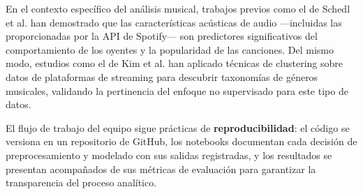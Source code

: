 En el contexto específico del análisis musical, trabajos previos como el de Schedl et al. \cite{schedl2018current} han demostrado que las características acústicas de audio ---incluidas las proporcionadas por la API de Spotify--- son predictores significativos del comportamiento de los oyentes y la popularidad de las canciones. Del mismo modo, estudios como el de Kim et al. \cite{kim2020music} han aplicado técnicas de clustering sobre datos de plataformas de streaming para descubrir taxonomías de géneros musicales, validando la pertinencia del enfoque no supervisado para este tipo de datos.

El flujo de trabajo del equipo sigue prácticas de \textbf{reproducibilidad}: el código se versiona en un repositorio de GitHub, los notebooks documentan cada decisión de preprocesamiento y modelado con sus salidas registradas, y los resultados se presentan acompañados de sus métricas de evaluación para garantizar la transparencia del proceso analítico.